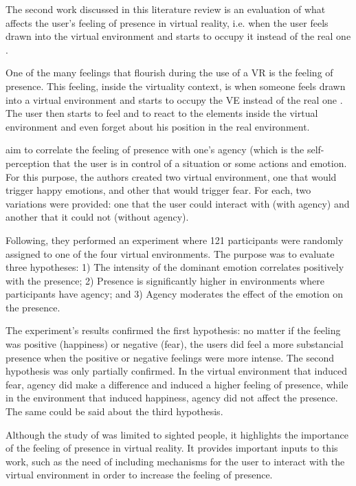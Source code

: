 The second work discussed in this literature review is an evaluation of what affects the user's feeling of presence in virtual reality, i.e. when the user feels drawn into the virtual environment and starts to occupy it instead of the real one \cite{cummings2016immersive}.

One of the many feelings that flourish during the use of a VR is the feeling of presence. This feeling, inside the virtuality context, is when someone feels drawn into a virtual environment and starts to occupy the VE instead of the real one \cite{cummings2016immersive}. The user then starts to feel and to react to the elements inside the virtual environment and even forget about his position in the real environment.

 aim to correlate the feeling of presence with one's agency (which is the self-perception that the user is in control of a situation or some actions \cite{farrer2002experiencing} and emotion. For this purpose, the authors created two virtual environment, one that would trigger happy emotions, and other that would trigger fear. For each, two variations were provided: one that the user could interact with (with agency) and another that it could not (without agency).

Following, they performed an experiment where 121 participants were randomly assigned to one of the four virtual environments. The purpose was to evaluate three hypotheses: 1) The intensity of the dominant emotion correlates positively with the presence; 2) Presence is significantly higher in environments where participants have agency; and 3) Agency moderates the effect of the emotion on the presence.

The experiment's results confirmed the first hypothesis: no matter if the feeling was positive (happiness) or negative (fear), the users did feel a more substancial presence when the positive or negative feelings were more intense. The second hypothesis was only partially confirmed. In the virtual environment that induced fear, agency did make a difference and induced a higher feeling of presence, while in the environment that induced happiness, agency did not affect the presence. The same could be said about the third hypothesis.

Although the study of  was limited to sighted people, it highlights the importance of the feeling of presence in virtual reality. It provides important inputs to this work, such as the need of including mechanisms for the user to interact with the virtual environment in order to increase the feeling of presence. 
